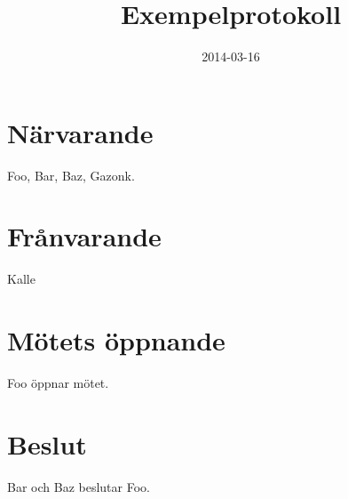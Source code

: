 \documentclass{protokoll}
\title{Exempelprotokoll}
\date{2014-03-16}
\begin{document}
\maketitle

\section*{Närvarande}

Foo, Bar, Baz, Gazonk.

\section*{Frånvarande}

Kalle
\pagebreak
\section{Mötets öppnande}

Foo öppnar mötet.

\section{Beslut}

Bar och Baz beslutar Foo.
\end{document}
